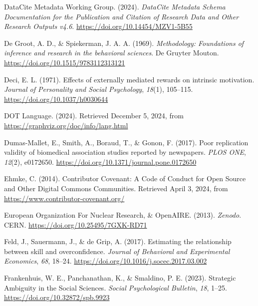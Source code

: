 \documentclass[
  man, noextraspace,floatsintext]{apa6}
\newlength{\cslhangindent}
\newenvironment{CSLReferences}[2] %
 {\begin{list}{}{%
  \setlength{\itemindent}{0pt}
  \setlength{\leftmargin}{0pt}
  \setlength{\parsep}{0pt}
  \ifodd #1
   \setlength{\leftmargin}{\cslhangindent}
   \setlength{\itemindent}{-1\cslhangindent}
  \fi
  \setlength{\itemsep}{#2\baselineskip}}}
 {\end{list}}
\begin{document}
\begin{CSLReferences}{1}{0}
DataCite Metadata Working Group. (2024). \emph{{DataCite Metadata Schema Documentation} for the {Publication} and {Citation} of {Research Data} and {Other Research Outputs} v4.6}. \url{https://doi.org/10.14454/MZV1-5B55}

De Groot, A. D., \& Spiekerman, J. A. A. (1969). \emph{Methodology: {Foundations} of inference and research in the behavioral sciences}. De Gruyter Mouton. \url{https://doi.org/10.1515/9783112313121}

Deci, E. L. (1971). Effects of externally mediated rewards on intrinsic motivation. \emph{Journal of Personality and Social Psychology}, \emph{18}(1), 105--115. \url{https://doi.org/10.1037/h0030644}

{DOT Language}. (2024). Retrieved December 5, 2024, from \url{https://graphviz.org/doc/info/lang.html}

Dumas-Mallet, E., Smith, A., Boraud, T., \& Gonon, F. (2017). Poor replication validity of biomedical association studies reported by newspapers. \emph{PLOS ONE}, \emph{12}(2), e0172650. \url{https://doi.org/10.1371/journal.pone.0172650}

Ehmke, C. (2014). Contributor {Covenant}: {A Code} of {Conduct} for {Open Source} and {Other Digital Commons Communities}. Retrieved April 3, 2024, from \url{https://www.contributor-covenant.org/}

European Organization For Nuclear Research, \& OpenAIRE. (2013). \emph{Zenodo}. CERN. \url{https://doi.org/10.25495/7GXK-RD71}

Feld, J., Sauermann, J., \& de Grip, A. (2017). Estimating the relationship between skill and overconfidence. \emph{Journal of Behavioral and Experimental Economics}, \emph{68}, 18--24. \url{https://doi.org/10.1016/j.socec.2017.03.002}

Frankenhuis, W. E., Panchanathan, K., \& Smaldino, P. E. (2023). Strategic {Ambiguity} in the {Social Sciences}. \emph{Social Psychological Bulletin}, \emph{18}, 1--25. \url{https://doi.org/10.32872/spb.9923}


\end{CSLReferences}
\end{document}

